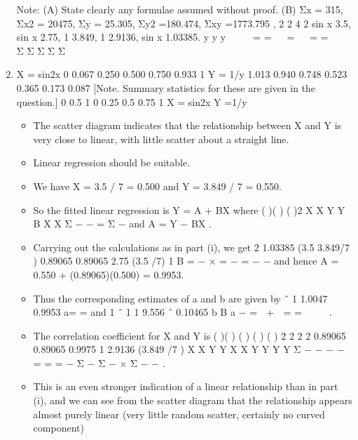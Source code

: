 \documentclass[a4paper,12pt]{article}
\begin{document}
\begin{enumerate}
\begin{framed}
Note: (A) State clearly any formulae assumed without proof.
(B) Σx = 315, Σx2 = 20475, Σy = 25.305, Σy2 =180.474, Σxy =1773.795 ,
2
2 4
2
sin x 3.5, sin x 2.75, 1 3.849, 1 2.9136, sin x 1.03385.
y y y
   
= =   =   = =
   
Σ Σ Σ Σ Σ
\end{framed}
\item 
X = sin2x 0 0.067 0.250 0.500 0.750 0.933 1
Y = 1/y 1.013 0.940 0.748 0.523 0.365 0.173 0.087
[Note. Summary statistics for these are given in the question.]
0
0.5
1
0 0.25 0.5 0.75 1
X = sin2x
Y
=1/y
\begin{itemize}
\item 
The scatter diagram indicates that the relationship between X and Y is very close to
linear, with little scatter about a straight line. 
\item Linear regression should be suitable.
\item  We have X = 3.5 / 7 = 0.500 and Y = 3.849 / 7 = 0.550.
\item  So the fitted linear regression is Y = A + BX where ( )( )
( )2
X X Y Y
B
X X
Σ − −
=
Σ −
and
A = Y − BX .
\item  Carrying out the calculations as in part (i), we get
2
1.03385 (3.5 3.849/7 ) 0.89065 0.89065
2.75 (3.5 /7) 1
B = − × = − = −
−
and hence A = 0.550 + (0.89065)(0.500) = 0.9953.
\item Thus the corresponding estimates of a and b are given by ˆ 1 1.0047
0.9953
a= = and
1 ˆ 1 1 9.556
ˆ 0.10465
b B
a
− =  +  = =  
 
.
\item The correlation coefficient for X and Y is
( )( )
( ) ( ) ( ) 2 2 2 2
0.89065 0.89065 0.9975
1 2.9136 (3.849 /7 )
X X Y Y
X X Y Y Y Y
Σ − − − − = = = −
Σ − Σ − × Σ − −
.
\item This is an even stronger indication of a linear relationship than in part (i), and we can
see from the scatter diagram that the relationship appears almost purely linear (very
little random scatter, certainly no curved component)
\end{itemize}

\end{enumerate}
\end{document}
